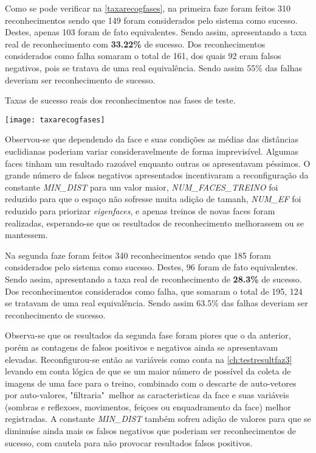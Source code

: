 Como se pode verificar na \autoref{taxarecogfases}, na primeira faze foram feitos 310 reconhecimentos sendo que 149 foram considerados pelo sistema como sucesso. Destes, apenas 103 foram de fato equivalentes. Sendo assim, apresentando a taxa real de reconhecimento com \textbf{33.22\%} de sucesso. Dos reconhecimentos considerados como falha somaram o total de 161, dos quais 92 eram falsos negativos, pois se tratava de uma real equivalência. Sendo assim 55\% das falhas deveriam ser reconhecimento de sucesso. 

\begin{table}[h]
	\centering
	\caption{Taxas de sucesso reais dos reconhecimentos nas fases de teste.}
	\texttt{[image: taxarecogfases]}
	\label{taxarecogfases}
\end{table}

Observou-se que dependendo da face e suas condições as médias das distâncias euclidianas poderiam variar consideravelmente de forma imprevisível. Algumas faces tinham um resultado razoável enquanto outras os apresentavam péssimos. O grande número de falsos negativos apresentados incentivaram a reconfiguração da constante \textit{MIN\_DIST} para um valor maior, \textit{NUM\_FACES\_TREINO} foi reduzido para que o espaço não sofresse muita adição de tamanh, \textit{NUM\_EF} foi reduzido para priorizar \textit{eigenfaces}, e apenas treinos de novas faces foram realizadas, esperando-se que os resultados de reconhecimento melhorassem ou se mantessem.


Na segunda faze foram feitos 340 reconhecimentos sendo que 185 foram considerados pelo sistema como sucesso. Destes, 96 foram de fato equivalentes. Sendo assim, apresentando a taxa real de reconhecimento de \textbf{28.3\%} de sucesso. Dos reconhecimentos considerados como falha, que somaram o total de 195, 124 se tratavam de uma real equivalência. Sendo assim 63.5\% das falhas deveriam ser reconhecimento de sucesso.

Observa-se que os resultados da segunda fase foram piores que o da anterior, porém as contagens de falsos positivos e negativos ainda se apresentavam elevadas. Reconfigurou-se então as variáveis como conta na \autoref{ch:testresultfaz3} levando em conta lógica de que se um maior número de possível da coleta de imagens de uma face para o treino, combinado com o descarte de auto-vetores por auto-valores, "filtraria"\ melhor as caracteristicas da face e suas variáveis (sombras e reflexoes, movimentos, feiçoes ou enquadramento da face) melhor registradas. A constante \textit{MIN\_DIST} também sofreu adição de valores para que se diminuíse ainda mais os falsos negativos que poderiam ser reconhecimentos de sucesso, com cautela para não provocar resultados falsos positivos.


